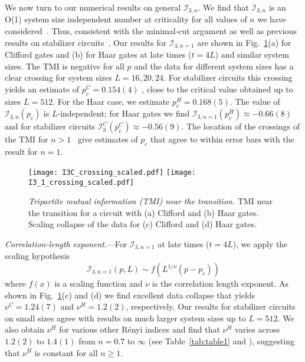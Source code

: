 \documentclass[prl,twocolumn,aps,showpacs,amsmath,amssymb,superscriptaddress,floatfix,longbibliography]{revtex4-1}
\begin{document}
We now turn to our numerical results on general $\mathcal{I}_{3,n}$. We find that $\mathcal{I}_{3,n}$ is an O(1) system size independent number at criticality for all values of $n$ we have considered~\cite{suppmat}. Thus, consistent with the minimal-cut argument as well as previous results on stabilizer circuits~\cite{Gullans2019}. Our results for $\mathcal{I}_{3,n=1}$ are shown in Fig.~\ref{fig:I3}(a) for Clifford gates and (b) for Haar gates at late times ($t=4L$) and similar system sizes. The TMI is negative for all $p$ and the data for different system sizes has a clear crossing for system sizes $L=16,20,24$. For stabilizer circuits this crossing yields an estimate of $p_c^C=0.154(4)$ , close to the critical value obtained up to sizes $L=512$.  For the Haar case, we estimate $p_c^H = 0.168(5)$. The value of $\mathcal{I}_{3,n}(p_c)$ is $L$-independent; for Haar gates we find $\mathcal{I}_{3,n=1}(p_c^H) \approx -0.66(8)$ and for stabilizer circuits $\mathcal{I}^C_{3}(p_c^C) \approx -0.56(9)$.  
The location of the crossings of the TMI for $n > 1$~\cite{suppmat} give estimates of $p_c$ that agree to within error bars with the result for $n = 1$. 

\begin{figure}[tb]
\centering
           \texttt{[image: I3C\_crossing\_scaled.pdf]}
           \texttt{[image: I3\_1\_crossing\_scaled.pdf]}
   \caption{\emph{Tripartite mutual information (TMI) near the transition.} TMI near the transition for a circuit with (a) Clifford  and (b) Haar gates. Scaling collapse of the data for (c) Clifford and (d) Haar gates.}
  \label{fig:I3}
\end{figure}

\emph{Correlation-length exponent}.---For $\mathcal{I}_{3,n=1}$ at late times ($t=4L$), we apply the scaling hypothesis
\begin{equation}\label{i3scalingform}
\mathcal{I}_{3,n=1}(p,L) \sim f(L^{1/\nu}(p-p_c))
\end{equation}
where $f(x)$ is a scaling function and $\nu$ is the correlation length exponent.  As shown in Fig.~\ref{fig:I3}(c) and (d) we find excellent data collapse that yields $\nu^C = 1.24 (7)$ and $\nu^H = 1.2(2)$, respectively. Our results for stabilizer circuits on small sizes agree with results on much larger system sizes up to $L=512$. We also obtain $\nu^H$ for various other R\'enyi indices and find that $\nu^H$ varies across $1.2(2)$ to $1.4(1)$ from $n=0.7$ to $\infty$ (see Table~\ref{tab:table1} and \cite{suppmat}), suggesting that $\nu^H$ is constant for all $n\ge 1$.
\end{document}
